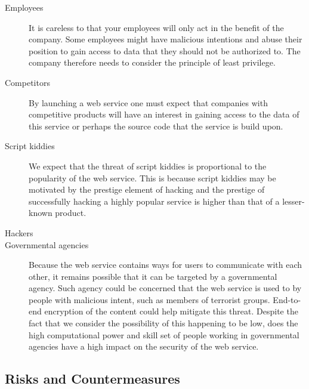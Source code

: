 \documentclass{article}
\begin{document}
\begin{description}

\item[Employees]
It is careless to that your employees will only act in the benefit of the company. Some employees might have malicious intentions and abuse their position to gain access to data that they should not be authorized to. The company therefore needs to consider the principle of least privilege. 

\item[Competitors]
By launching a web service one must expect that companies with competitive products will have an interest in gaining access to the data of this service or perhaps the source code that the service is build upon. 

\item[Script kiddies]
We expect that the threat of script kiddies is proportional to the popularity of the web service. This is because script kiddies may be motivated by the prestige element of hacking and the prestige of successfully hacking a highly popular service is higher than that of a lesser-known product.

\item[Hackers]

\item[Governmental agencies]
Because the web service contains ways for users to communicate with each other, it remains possible that it can be targeted by a governmental agency. Such agency could be concerned that the web service is used to by people with malicious intent, such as members of terrorist groups. End-to-end encryption of the content could help mitigate this threat. Despite the fact that we consider the possibility of this happening to be low, does the high computational power and skill set of people working in governmental agencies have a high impact on the security of the web service. 
 
\end{description}




% 
% 

\subsection{Risks and Countermeasures}
\end{document}

